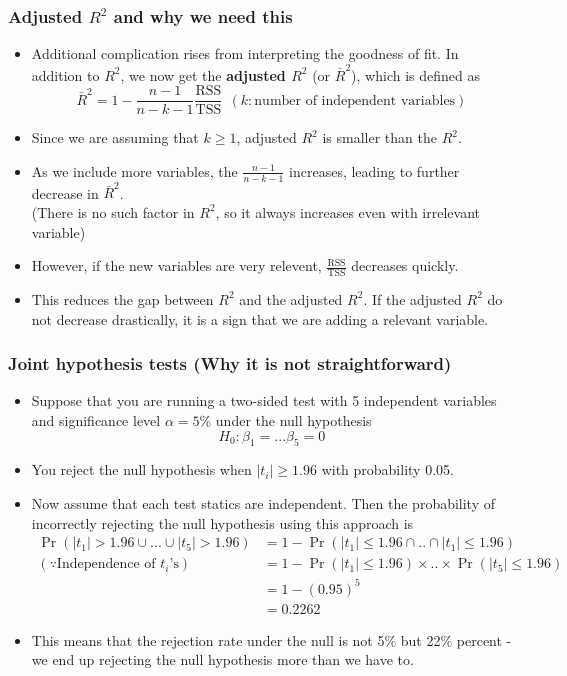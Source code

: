 \documentclass[aspectratio=169]{beamer}
\begin{document}
\begin{frame}
\frametitle{Adjusted $R^2$ and why we need this}
\begin{itemize}
 \item Additional complication rises from interpreting the goodness of fit. In addition to $R^2$, we now get the \textbf{adjusted $R^2$} (or $\bar{R}^2$), which is defined as
\[
\bar{R}^2 = 1-\frac{n-1}{n-k-1}\frac{\text{RSS}}{\text{TSS}} \ \ (k:\text{number of independent variables})
\]
\item Since we are assuming that $k\geq 1$, adjusted $R^2$ is smaller than the $R^2$. 
\item As we include more variables, the $\frac{n-1}{n-k-1}$ increases, leading to further decrease in  $\bar{R}^2$. \\ (There is no such factor in $R^2$, so it always increases even with irrelevant variable)
\item However, if the new variables are very relevent, $\frac{\text{RSS}}{\text{TSS}}$ decreases quickly. 
\item This reduces the gap between $R^2$ and the adjusted $R^2$. If the adjusted $R^2$ do not decrease drastically, it is a sign that we are adding a relevant variable. \par\medskip
\end{itemize}
\end{frame}


\begin{frame}
\frametitle{Joint hypothesis tests (Why it is not straightforward)}
\begin{itemize}
\item Suppose that you are running a two-sided test with 5 independent variables and significance level $\alpha = 5\%$ under the null hypothesis
\[
H_0: \beta_1=...\beta_5=0
\]
\item You reject the null hypothesis when $|t_i|\geq 1.96 $ with probability 0.05. 
\item Now assume that each test statics are independent. Then the probability of incorrectly rejecting the null hypothesis using this approach is
\footnotesize{\[
\begin{aligned}
\Pr(|t_1|>1.96 \cup...\cup |t_5|>1.96) & =1-\Pr(|t_1|\leq1.96\cap .. \cap|t_1|\leq1.96)\\
(\because\text{Independence of $t_i$'s}) \ \ &=1-\Pr(|t_1|\leq1.96)\times ..\times\Pr(|t_5|\leq1.96) \\
 & = 1-(0.95)^5 \\
 &= 0.2262
\end{aligned}
\]}\normalsize
\item This means that the rejection rate under the null is not 5\% but 22\% percent - we end up rejecting the null hypothesis more than we have to.
\end{itemize}
\end{frame}
\end{document}
